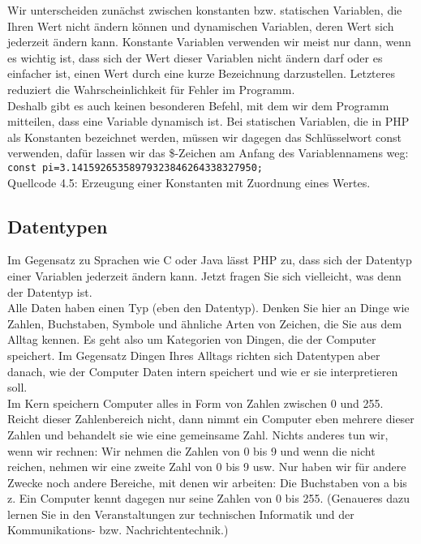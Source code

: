 Wir unterscheiden zunächst zwischen konstanten bzw. statischen Variablen, die Ihren Wert nicht ändern können und dynamischen Variablen, deren Wert sich jederzeit ändern kann. Konstante Variablen verwenden wir meist nur dann, wenn es wichtig ist, dass sich der Wert dieser Variablen nicht ändern darf oder es einfacher ist, einen Wert durch eine kurze Bezeichnung darzustellen. Letzteres reduziert die Wahrscheinlichkeit für Fehler im Programm.\\

Deshalb gibt es auch keinen besonderen \glqq{}Befehl\grqq{}, mit dem wir dem Programm mitteilen, dass eine Variable dynamisch ist. Bei statischen Variablen, die in PHP als Konstanten bezeichnet werden, müssen wir dagegen das Schlüsselwort const verwenden, dafür lassen wir das \$-Zeichen am Anfang des Variablennamens weg:\\

\verb|const pi=3.14159265358979323846264338327950;|\\
Quellcode 4.5: Erzeugung einer Konstanten mit Zuordnung eines Wertes.

\subsection{Datentypen}

Im Gegensatz zu Sprachen wie C oder Java lässt PHP zu, dass sich der Datentyp einer Variablen jederzeit ändern kann. Jetzt fragen Sie sich vielleicht, was denn der Datentyp ist.\\

Alle Daten haben einen Typ (eben den Datentyp). Denken Sie hier an Dinge wie Zahlen, Buchstaben, Symbole und ähnliche Arten von Zeichen, die Sie aus dem Alltag kennen. Es geht also um Kategorien von Dingen, die der Computer speichert. Im Gegensatz Dingen Ihres Alltags richten sich Datentypen aber danach, wie der Computer Daten intern speichert und wie er sie interpretieren soll.\\


Im Kern speichern Computer alles in Form von Zahlen zwischen 0 und 255. Reicht dieser Zahlenbereich nicht, dann nimmt ein Computer eben mehrere dieser Zahlen und behandelt sie wie eine gemeinsame Zahl. Nichts anderes tun wir, wenn wir rechnen: Wir nehmen die Zahlen von 0 bis 9 und wenn die nicht reichen, nehmen wir eine zweite Zahl von 0 bis 9 usw. Nur haben wir für andere Zwecke noch andere Bereiche, mit denen wir arbeiten: Die Buchstaben von a bis z. Ein Computer kennt dagegen nur seine Zahlen von 0 bis 255. (Genaueres dazu lernen Sie in den Veranstaltungen zur technischen Informatik und der Kommunikations- bzw. Nachrichtentechnik.)\\

